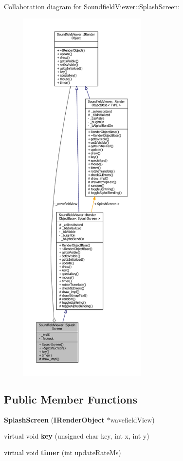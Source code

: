 Collaboration diagram for Soundfield\-Viewer\-:\-:Splash\-Screen\-:\nopagebreak
\begin{figure}[H]
\begin{center}
\leavevmode
\includegraphics[height=550pt]{d0/d8f/classSoundfieldViewer_1_1SplashScreen__coll__graph}
\end{center}
\end{figure}
\subsection*{Public Member Functions}
\begin{DoxyCompactItemize}
\item 
{\bfseries Splash\-Screen} ({\bf I\-Render\-Object} $\ast$wavefield\-View)\label{classSoundfieldViewer_1_1SplashScreen_a327ecddaf917cbd1b4335106aa37cd31}

\item 
virtual void {\bfseries key} (unsigned char key, int x, int y)\label{classSoundfieldViewer_1_1SplashScreen_ac4b965d87d29f11cf38112a341ffc8da}

\item 
virtual void {\bfseries timer} (int update\-Rate\-Ms)\label{classSoundfieldViewer_1_1SplashScreen_ad781ffedfeb2b05a1515b324428de581}

\end{DoxyCompactItemize}
